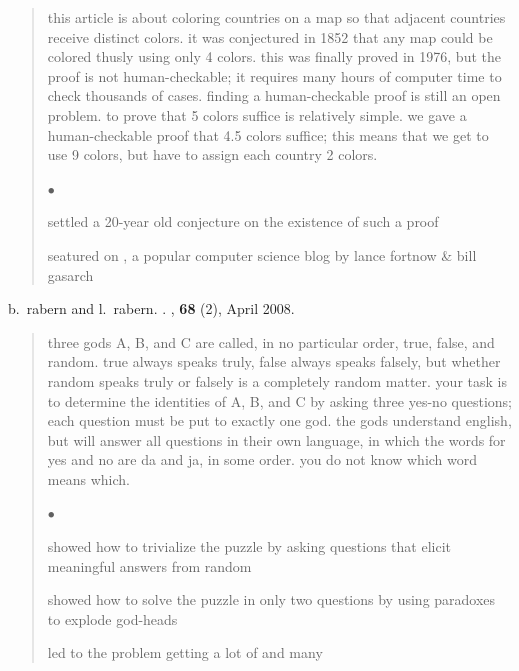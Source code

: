 \documentclass[12pt]{article}
\newcommand{\squishlist}{
   \begin{list}{$\bullet$}
    { \setlength{\itemsep}{0pt}    \setlength{\parsep}{0pt}
      \setlength{\topsep}{4.5pt}     \setlength{\partopsep}{0pt}
      \setlength{\leftmargin}{2em} \setlength{\labelwidth}{1.5em}
      \setlength{\labelsep}{0.5em} } }
\newcommand{\squishend}{
    \end{list}  }
\begin{document}
\begin{quote}
this article is about coloring countries on a map so that adjacent countries receive distinct colors. it was conjectured
in 1852 that any map could be colored thusly using only 4 colors. this was finally proved in 1976, but the proof is not human-checkable;
it requires many hours of computer time to check thousands of cases. finding a human-checkable proof is still an open problem.
to prove that 5 colors suffice is relatively simple.  we gave a human-checkable proof that 4.5 colors suffice; this means that
we get to use 9 colors, but have to assign each country 2 colors.
\squishlist
	\item settled a 20-year old conjecture on the existence of such a proof
	\item seatured on 
\href{http://blog.computationalcomplexity.org/2015/10/a-human-readable-proof-that-every.html}{\color{blue}{computational complexity}}, a popular computer science blog by lance fortnow \& bill gasarch
\squishend
\end{quote}
{\large
b.~rabern and l.~rabern.
\newblock \href{http://brianrabern.net/sshlpe.pdf}{\color{blue}{a simple solution to the hardest logic puzzle ever}}. 
, \textbf{68} (2), April 2008.}

\begin{quote}
three gods A, B, and C are called, in no particular order, true, false, and random. 
true always speaks truly, false always speaks falsely, but whether random speaks truly or falsely is a completely random matter. 
your task is to determine the identities of A, B, and C by asking three yes-no questions; each question must be put to exactly one god. 
the gods understand english, but will answer all questions in their own language, in which the words for yes and no are da and ja, in some order. 
you do not know which word means which.
	  \squishlist
		\item showed how to trivialize the puzzle by asking questions that elicit meaningful answers from random
		\item showed how to solve the puzzle in only two questions by using paradoxes to explode god-heads
		\item led to the problem getting a lot of \href{http://brianrabern.net/New_Scientist_HLPE.pdf}{\color{blue}{press}} 
		and many \href{https://scholar.google.com/scholar?oi=bibs&hl=en&cites=14941881349355280851}{\color{blue}{follow-up papers}}
      \squishend
\end{quote}
\end{document}

